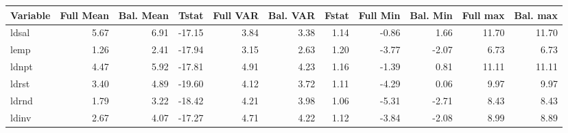 \begin{tabular}{lrrrrrrrrrr}
  \hline
Variable & Full Mean & Bal. Mean & Tstat & Full VAR & Bal. VAR & Fstat & Full Min & Bal. Min & Full max & Bal. max \\ 
  \hline
ldsal & 5.67 & 6.91 & -17.15 & 3.84 & 3.38 & 1.14 & -0.86 & 1.66 & 11.70 & 11.70 \\ 
  lemp & 1.26 & 2.41 & -17.94 & 3.15 & 2.63 & 1.20 & -3.77 & -2.07 & 6.73 & 6.73 \\ 
  ldnpt & 4.47 & 5.92 & -17.81 & 4.91 & 4.23 & 1.16 & -1.39 & 0.81 & 11.11 & 11.11 \\ 
  ldrst & 3.40 & 4.89 & -19.60 & 4.12 & 3.72 & 1.11 & -4.29 & 0.06 & 9.97 & 9.97 \\ 
  ldrnd & 1.79 & 3.22 & -18.42 & 4.21 & 3.98 & 1.06 & -5.31 & -2.71 & 8.43 & 8.43 \\ 
  ldinv & 2.67 & 4.07 & -17.27 & 4.71 & 4.22 & 1.12 & -3.84 & -2.08 & 8.99 & 8.89 \\ 
   \hline
\end{tabular}

